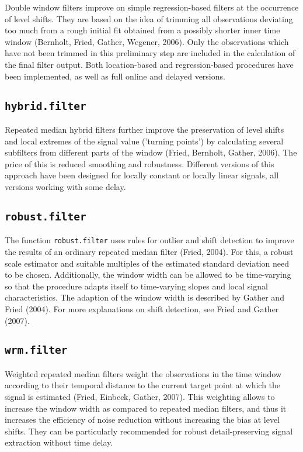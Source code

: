 \documentclass[a4paper]{scrartcl}
\begin{document}
Double window filters improve on simple regression-based filters
at the occurrence of level shifts. They are based on the idea of
trimming all observations deviating too much from a rough initial
fit obtained from a possibly shorter inner time window (Bernholt,
Fried, Gather, Wegener, 2006). Only the observations which have
not been trimmed in this preliminary step are included in the
calculation of the final filter output. Both location-based and
regression-based procedures have been implemented, as well as full
online and delayed versions.


\subsection{\texttt{hybrid.filter}}

Repeated median hybrid filters further improve the preservation of
level shifts and local extremes of the signal value ('turning
points') by calculating several subfilters from different parts of
the window (Fried, Bernholt, Gather, 2006). The price of this is
reduced smoothing and robustness. Different versions of this
approach have been designed for locally constant or locally linear
signals, all versions working with some delay.

\subsection{\texttt{robust.filter}}

The function \texttt{robust.filter} uses rules for outlier and
shift detection to improve the results of an ordinary repeated
median filter (Fried, 2004). For this, a robust scale estimator
and suitable multiples of the estimated standard deviation need to
be chosen. Additionally, the window width can be allowed to be
time-varying so that the procedure adapts itself to time-varying
slopes and local signal characteristics. The adaption of the
window width is described by Gather and Fried (2004). For more
explanations on shift detection, see Fried and Gather (2007).


\subsection{\texttt{wrm.filter}}

Weighted repeated median filters weight the observations in the
time window according to their temporal distance to the current
target point at which the signal is estimated (Fried, Einbeck,
Gather, 2007). This weighting allows to increase the window width as compared to
repeated median filters, and thus it increases the
efficiency of noise reduction without increasing the bias at level
shifts. They can be particularly recommended for robust
detail-preserving signal extraction without time delay.
\end{document}
